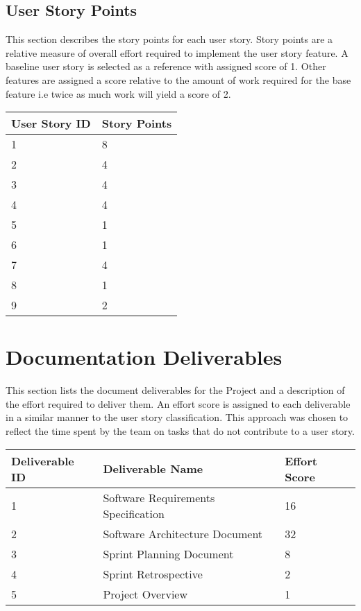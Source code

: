 \documentclass[11pt]{article}
\begin{document}
\subsection{User Story Points}
This section describes the story points for each user story. Story points are a relative measure of overall effort required to implement the user story feature. A baseline user story is selected as a reference with assigned score of 1. Other features are assigned a score relative to the amount of work required for the base feature i.e twice as much work will yield a score of 2.

\begin{table}[H]
	\begin{tabular}{@{}|l||l|@{}}
		\toprule
			\textbf{User Story ID}          & \textbf{Story Points }         \\ \midrule
		1 & 8	\\ \midrule
		2 & 4	\\ \midrule
	    3 & 4	\\ \midrule
		4 & 4	\\ \midrule
		5 & 1	\\ \midrule
		6 & 1	\\ \midrule
		7 & 4	\\ \midrule
		8 & 1	\\ \midrule
		9 & 2 \\ \bottomrule
	\end{tabular}
\end{table}

\section{Documentation Deliverables}
This section lists the document deliverables for the Project and a description of the effort required to deliver them. An effort score is assigned to each deliverable in a similar manner to the user story classification. This approach was chosen to reflect the time spent by the team on tasks that do not contribute to a user story.

\begin{table}[H]
	\begin{tabular}{@{}|l|l|l|@{}}
		\toprule
Deliverable ID	&	Deliverable  Name                   & Effort Score \\ \midrule
1	&	Software Requirements Specification & 16           \\ \midrule
2	&	Software Architecture Document      & 32           \\ \midrule
3	&	Sprint Planning Document            & 8            \\ \midrule
4	&	Sprint Retrospective                & 2            \\ \midrule
5 & Project Overview			&1							\\ \bottomrule
	\end{tabular}
\end{table}
\end{document}
